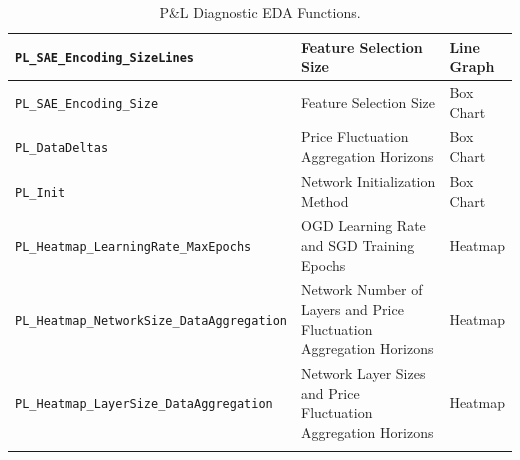 \documentclass[a4paper,11pt,oneside]{article}
\theoremstyle{plain}
\theoremstyle{definition}
\begin{document}
\begin{longtable}{|p{0.5\linewidth}|p{0.4\linewidth}|p{0.1\linewidth}|}
		\texttt{PL\_SAE\_Encoding\_SizeLines}& {Feature Selection Size} & {Line Graph} \\\hline
		\texttt{PL\_SAE\_Encoding\_Size} & {Feature Selection Size}& {Box Chart} \\\hline
		\texttt{PL\_DataDeltas} & {Price Fluctuation Aggregation Horizons}& {Box Chart} \\\hline
		\texttt{PL\_Init}& {Network Initialization Method} & {Box Chart} \\\hline		
		\texttt{PL\_Heatmap\_LearningRate\_MaxEpochs} & {OGD Learning Rate and SGD Training Epochs}& {Heatmap} \\\hline
		\texttt{PL\_Heatmap\_NetworkSize\_DataAggregation} & {Network Number of Layers and Price Fluctuation Aggregation Horizons}& {Heatmap} \\\hline
		\texttt{PL\_Heatmap\_LayerSize\_DataAggregation}& {Network Layer Sizes and Price Fluctuation Aggregation Horizons } & {Heatmap} \\\hline
		
		\caption{P\&L Diagnostic EDA Functions.}
		\label{tab_diagnostics_pl}
	\end{longtable}
	
\end{document}
